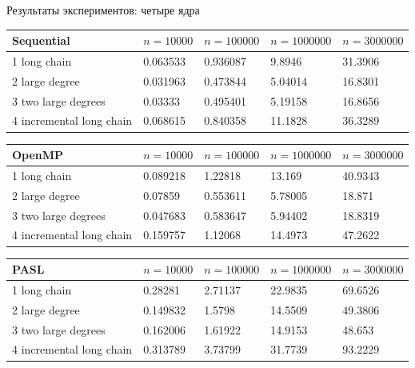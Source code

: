 \documentclass[hyperref=unicode,graphics=pdflatex,13pt]{beamer}
\begin{document}
\begin{frame}[shrink]{Результаты экспериментов: четыре ядра}

\begin{table}[!ht]
\centering
\begin{tabular}{|l|l|l|l|l|}\hline
Sequential	& $n=10000$ & $n=100000$ & $n=1000000$ & $n=3000000$ \\\hline
1 long chain & 0.063533	& 0.936087 & 9.8946 & 31.3906 \\\hline
2 large degree & 0.031963 & 0.473844 & 5.04014 & 16.8301 \\\hline
3 two large degrees & 0.03333 & 0.495401 & 5.19158 & 16.8656 \\\hline
4 incremental long chain & 0.068615 & 0.840358 & 11.1828 & 36.3289 \\\hline
\end{tabular}
\end{table}

\begin{table}[!ht]
\centering
\begin{tabular}{|l|l|l|l|l|}\hline
OpenMP	& $n=10000$ & $n=100000$ & $n=1000000$ & $n=3000000$ \\\hline
1 long chain & 0.089218 & 1.22818 & 13.169 & 40.9343 \\\hline
2 large degree & 0.07859 & 0.553611 & 5.78005 & 18.871 \\\hline
3 two large degrees & 0.047683 & 0.583647 & 5.94402 & 18.8319 \\\hline
4 incremental long chain & 0.159757 & 1.12068 & 14.4973 & 47.2622 \\\hline
\end{tabular}
\end{table}

\begin{table}[!ht]
\centering
\begin{tabular}{|l|l|l|l|l|}\hline
PASL	& $n=10000$ & $n=100000$ & $n=1000000$ & $n=3000000$ \\\hline
1 long chain & 0.28281	& 2.71137 & 22.9835 & 69.6526 \\\hline
2 large degree & 0.149832 & 1.5798 & 14.5509 & 49.3806 \\\hline
3 two large degrees & 0.162006 & 1.61922 & 14.9153 & 48.653 \\\hline
4 incremental long chain & 0.313789 & 3.73799 & 31.7739 & 93.2229 \\\hline
\end{tabular}
\end{table}
\end{frame}
\end{document}
